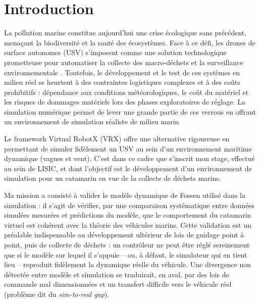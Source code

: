 \documentclass{rapportEILCO}
\begin{document}
	\newpage
	\tableofcontents
	\newpage
	\listoffigures%
	\newpage
	\listoftables
	\newpage
	
	\section*{Introduction}
	
	La pollution marine constitue aujourd'hui une crise écologique sans précédent, menaçant la biodiversité et la santé des écosystèmes. Face à ce défi, les drones de surface autonomes (USV) s'imposent comme une solution technologique prometteuse pour automatiser la collecte des macro-déchets et la surveillance environnementale \cite{atron}. Toutefois, le développement et le test de ces systèmes en milieu réel se heurtent à des contraintes logistiques complexes et à des coûts prohibitifs : dépendance aux conditions météorologiques, le coût du matériel et les risques de dommages matériels lors des phases exploratoires de réglage. La simulation numérique permet de lever une grande partie de ces verrous en offrant un environnement de simulation réaliste de milieu marin
	
	Le framework Virtual RobotX (VRX) \cite{vrx} offre une alternative rigoureuse en permettant de simuler fidèlement un USV au sein d'un environnement maritime dynamique (vagues et vent). C'est dans ce cadre que s'inscrit mon stage, effectué au sein de LISIC, et dont l'objectif est le développement d'un environnement de simulation pour un catamarin en vue de la collecte de déchets marins.
	
	Ma mission a consisté à valider le modèle dynamique de Fossen utilisé dans la simulation : il s'agit de vérifier, par une comparaison systématique entre données simulées mesurées et prédictions du modèle, que le comportement du catamarin virtuel est cohérent avec la théorie des véhicules marins. Cette validation est un préalable indispensable au développement ultérieur de lois de guidage point à point, puis de collecte de déchets : un contrôleur ne peut être réglé sereinement que si le modèle sur lequel il s'appuie -- ou, à défaut, le simulateur qui en tient lieu -- reproduit fidèlement la dynamique réelle du véhicule. Une divergence non détectée entre modèle et simulation se traduirait, en aval, par des lois de commande mal dimensionnées et un transfert difficile vers le véhicule réel (problème dit du \emph{sim-to-real gap}).
	
\end{document}
